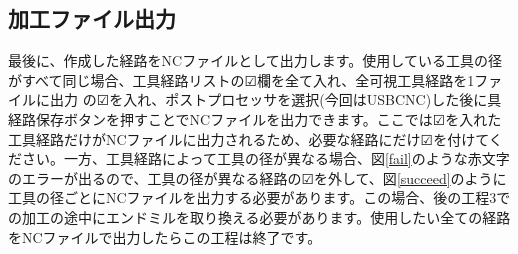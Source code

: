 \documentclass[b5paper, 9pt, twocolumn, titlepage,openany]{jsbook}%
\begin{document}


\clearpage
\subsection{加工ファイル出力}

最後に、作成した経路をNCファイルとして出力します。使用している工具の径がすべて同じ場合、工具経路リストの☑欄を全て入れ、全可視工具経路を1ファイルに出力 の☑を入れ、ポストプロセッサを選択(今回はUSBCNC)した後に具経路保存ボタンを押すことでNCファイルを出力できます。ここでは☑を入れた工具経路だけがNCファイルに出力されるため、必要な経路にだけ☑を付けてください。一方、工具経路によって工具の径が異なる場合、図\ref{fail}のような赤文字のエラーが出るので、工具の径が異なる経路の☑を外して、図\ref{succeed}のように工具の径ごとにNCファイルを出力する必要があります。この場合、後の工程3での加工の途中にエンドミルを取り換える必要があります。使用したい全ての経路をNCファイルで出力したらこの工程は終了です。\\
\end{document}
